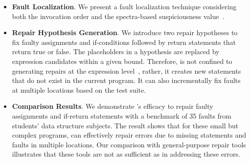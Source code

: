 \begin{itemize}
\item \textbf{Fault Localization}.  We present a fault localization technique  considering both the invocation order and the spectra-based suspiciousness value~\cite{tarantula:ase05}. 

\item \textbf{Repair Hypothesis Generation}.  We introduce two  repair hypotheses to fix faulty assignments and if-conditions followed by return statements that return true or false. The placeholders in a hypothesis are replaced by expression candidates within a given bound.  Therefore, \tool is not confined to generating repairs at the expression level~\cite{nopol:cstva14, spr:fse15}, rather, it   creates new statements that do not exist in the current program.  It can also incrementally fix  faults at multiple locations based on the test suite. 



\item \textbf{Comparison Results}. We demonstrate \tool's efficacy to repair faulty assignments and if-return statements  with a benchmark of 35 faults from students' data structure subjects. The result shows that for these small but complex programs,  \tool can effectively repair errors  due to  missing statements and faults in multiple locations. Our comparison with general-purpose repair tools  illustrates that these tools are not as sufficient as \tool in addressing these errors. 

\end{itemize}


